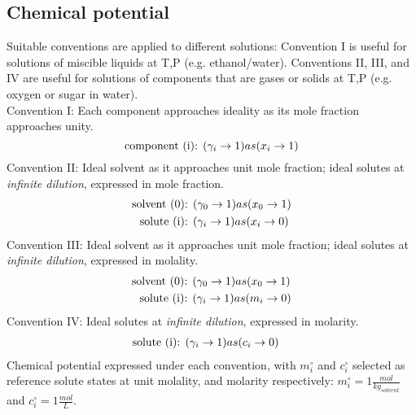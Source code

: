 \documentclass[onecolumn]{article}
\begin{document}
\subsection{Chemical potential \cite{Denbigh1968} }
\label{subsec:chemical_potential}
Suitable conventions are applied to different solutions: Convention I is useful for solutions of miscible liquids at T,P (e.g. ethanol/water). Conventions II, III, and IV are useful for solutions of components that are gases or solids at T,P (e.g. oxygen or sugar in water). \\
Convention I: Each component approaches ideality as its mole fraction approaches unity.
\begin{equation}
\textnormal{component (i): } (\gamma_i \rightarrow 1) as  (x_i \rightarrow 1)\\
\end{equation}
Convention II: Ideal solvent as it approaches unit mole fraction; ideal solutes at \textit{infinite dilution}, expressed in mole fraction.\\
\begin{equation}
\begin{aligned}
\textnormal{solvent (0): } & (\gamma_0 \rightarrow 1) as  (x_0 \rightarrow 1)\\
\textnormal{solute (i): } & (\gamma_i \rightarrow 1) as (x_i \rightarrow 0)
\end{aligned}
\end{equation}
Convention III: Ideal solvent as it approaches unit mole fraction; ideal solutes at \textit{infinite dilution}, expressed in molality. \\
\begin{equation}
\begin{aligned}
\textnormal{solvent (0): } & (\gamma_0 \rightarrow 1) as  (x_0 \rightarrow 1)\\
\textnormal{solute (i): } & (\gamma_i \rightarrow 1) as (m_i \rightarrow 0)
\end{aligned}
\end{equation}
Convention IV: Ideal solutes at \textit{infinite dilution}, expressed in molarity. \\
\begin{equation}
\begin{aligned}
\textnormal{solute (i): } & (\gamma_i \rightarrow 1) as (c_i \rightarrow 0)
\end{aligned}
\end{equation}
Chemical potential expressed under each convention, with $m_i^{\circ}$ and $c_i^{\circ}$ selected as reference solute states at unit molality, and molarity respectively: $m_i^{\circ}=1 \frac{mol}{kg_{solvent}}$ and $c_i^{\circ}=1 \frac{mol}{L}$.
\end{document}
